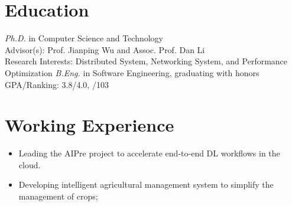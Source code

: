 \documentclass{resume}
\begin{document}



\section{Education}
\textit{Ph.D.} in Computer Science and Technology\\
Advisor(s): Prof. Jianping Wu and Assoc. Prof. Dan Li\\
Research Interests: Distributed System, Networking System, and Performance Optimization
\textit{B.Eng.} in Software Engineering, graduating with honors\\
GPA/Ranking: 3.8/4.0,  \nth{1}/103

\section{Working Experience}
\begin{itemize}
	\item Leading the AIPre project to accelerate end-to-end DL workflows in the cloud.
\end{itemize}

\begin{itemize}
	\item Developing intelligent agricultural management system to simplify the management of crops;
\end{itemize}
\end{document}
